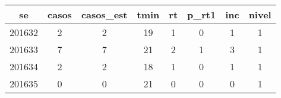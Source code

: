 \begin{tabular}{c|ccccccc}
  \hline
se & casos & casos\_est & tmin & rt & p\_rt1 & inc & nivel \\ 
  \hline
201632 & 2 & 2 & 19 & 1 & 0 & 1 & 1 \\ 
  201633 & 7 & 7 & 21 & 2 & 1 & 3 & 1 \\ 
  201634 & 2 & 2 & 18 & 1 & 0 & 1 & 1 \\ 
  201635 & 0 & 0 & 21 & 0 & 0 & 0 & 1 \\ 
   \hline
\end{tabular}
